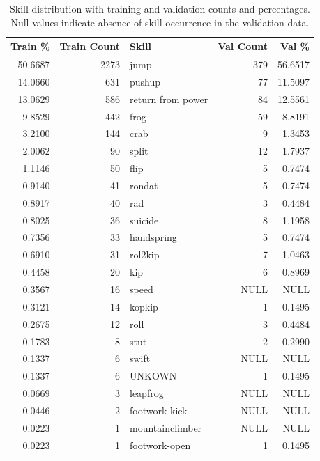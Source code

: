 \begin{table}[h!]
    \centering
    \begin{tabular}{|r|r|l|r|r|}
        \hline
        \textbf{Train \%} & \textbf{Train Count} & \textbf{Skill} & \textbf{Val Count} & \textbf{Val \%} \\
        \hline
        50.6687 & 2273 & jump & 379 & 56.6517 \\
        14.0660 & 631 & pushup & 77 & 11.5097 \\
        13.0629 & 586 & return from power & 84 & 12.5561 \\
        9.8529 & 442 & frog & 59 & 8.8191 \\
        3.2100 & 144 & crab & 9 & 1.3453 \\
        2.0062 & 90 & split & 12 & 1.7937 \\
        1.1146 & 50 & flip & 5 & 0.7474 \\
        0.9140 & 41 & rondat & 5 & 0.7474 \\
        0.8917 & 40 & rad & 3 & 0.4484 \\
        0.8025 & 36 & suicide & 8 & 1.1958 \\
        0.7356 & 33 & handspring & 5 & 0.7474 \\
        0.6910 & 31 & rol2kip & 7 & 1.0463 \\
        0.4458 & 20 & kip & 6 & 0.8969 \\
        0.3567 & 16 & speed & NULL & NULL \\
        0.3121 & 14 & kopkip & 1 & 0.1495 \\
        0.2675 & 12 & roll & 3 & 0.4484 \\
        0.1783 & 8 & stut & 2 & 0.2990 \\
        0.1337 & 6 & swift & NULL & NULL \\
        0.1337 & 6 & UNKOWN & 1 & 0.1495 \\
        0.0669 & 3 & leapfrog & NULL & NULL \\
        0.0446 & 2 & footwork-kick & NULL & NULL \\
        0.0223 & 1 & mountainclimber & NULL & NULL \\
        0.0223 & 1 & footwork-open & 1 & 0.1495 \\
        \hline
    \end{tabular}
    \caption[Skill distribution skill]{Skill distribution with training and validation counts and percentages. Null values indicate absence of skill occurrence in the validation data.}
    \label{tab:skill_distribution_full_with_nulls}
\end{table}


